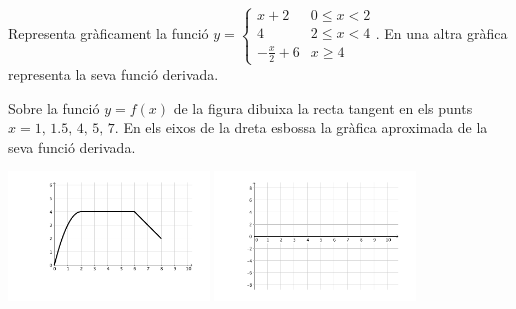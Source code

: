 \begin{mylist}


\exer Representa gràficament la funció 
$y=\left\{ \begin{array}{ll} 
	x+2 & 0\leq x < 2  \\ 
	4   & 2 \leq x < 4 \\ 
	-\frac{x}{2}+6 & x\geq 4
\end{array} \right.$. En una altra gràfica representa la seva funció derivada.


\exer Sobre la funció $y=f(x)$ de la figura dibuixa la recta tangent en els punts $x=1,\,1.5,\,4,\,5,\,7$. En els eixos de la dreta esbossa la gràfica aproximada de la seva funció derivada.

\begin{center}
\includegraphics*[width=0.4\textwidth]{img-07/chap-deriv-atrossos1}
\includegraphics*[width=0.4\textwidth]{img-07/chap-deriv-atrossos2}
\end{center}


\end{mylist}

